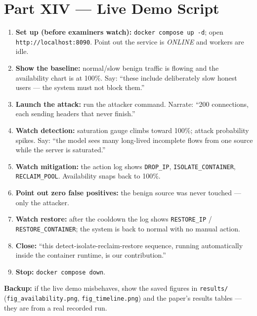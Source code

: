 \documentclass[11pt,a4paper]{article}
\begin{document}
\section{Part XIV --- Live Demo Script}
\begin{enumerate}
  \item \textbf{Set up (before examiners watch):} \texttt{docker compose up -d};
  open \texttt{http://localhost:8090}. Point out the service is \emph{ONLINE} and
  workers are idle.
  \item \textbf{Show the baseline:} normal/slow benign traffic is flowing and the
  availability chart is at 100\%. Say: ``these include deliberately slow honest
  users --- the system must not block them.''
  \item \textbf{Launch the attack:} run the attacker command. Narrate: ``200
  connections, each sending headers that never finish.''
  \item \textbf{Watch detection:} saturation gauge climbs toward 100\%; attack
  probability spikes. Say: ``the model sees many long-lived incomplete flows from
  one source while the server is saturated.''
  \item \textbf{Watch mitigation:} the action log shows \texttt{DROP\_IP},
  \texttt{ISOLATE\_CONTAINER}, \texttt{RECLAIM\_POOL}. Availability snaps back to
  100\%.
  \item \textbf{Point out zero false positives:} the benign source was never
  touched --- only the attacker.
  \item \textbf{Watch restore:} after the cooldown the log shows
  \texttt{RESTORE\_IP} / \texttt{RESTORE\_CONTAINER}; the system is back to normal
  with no manual action.
  \item \textbf{Close:} ``this detect-isolate-reclaim-restore sequence, running
  automatically inside the container runtime, is our contribution.''
  \item \textbf{Stop:} \texttt{docker compose down}.
\end{enumerate}
\textbf{Backup:} if the live demo misbehaves, show the saved figures in
\texttt{results/} (\texttt{fig\_availability.png}, \texttt{fig\_timeline.png}) and
the paper's results tables --- they are from a real recorded run.

\end{document}

